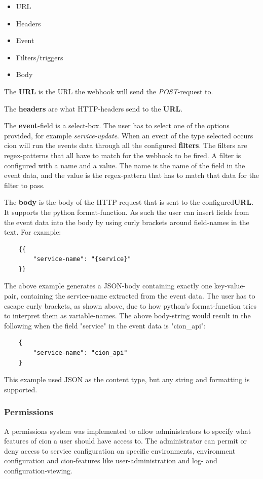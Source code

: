 \begin{itemize}
    \item URL
    \item Headers
    \item Event
    \item Filters/triggers
    \item Body
\end{itemize}

The \textbf{URL} is the URL the webhook will send the \textit{POST}-request to.

The \textbf{headers} are what HTTP-headers send to the \textbf{URL}.

The \textbf{event}-field is a select-box. The user has to select one of the options provided, for example \textit{service-update}. 
When an event of the type selected occurs cion will run the events data through all the configured \textbf{filters}. The filters are regex-patterns that all have to match for the webhook to be fired. A filter is configured with a name and a value. The name is the name of the field in the event data, and the value is the regex-pattern that has to match that data for the filter to pass.

The \textbf{body} is the body of the HTTP-request that is sent to the configured\textbf{URL}. It supports the python format-function. As such the user can insert fields from the event data into the body by using curly brackets around field-names in the text. For example:

\begin{verbatim}
    {{
        "service-name": "{service}"
    }}
\end{verbatim}

The above example generates a JSON-body containing exactly one key-value-pair, containing the service-name extracted from the event data. 
The user has to escape curly brackets, as shown above, due to how python's format-function tries to interpret them as variable-names.
The above body-string would result in the following when the field "service" in the event data is "cion\_api":

\begin{verbatim}
    {
        "service-name": "cion_api"
    }
\end{verbatim}

This example used JSON as the content type, but any string and formatting is supported. 


\subsubsection{Permissions}
A permissions system was implemented to allow administrators to specify what features of cion a user should have access to. The administrator can permit or deny access to service configuration on specific environments, environment configuration and cion-features like user-administration and log- and configuration-viewing.


